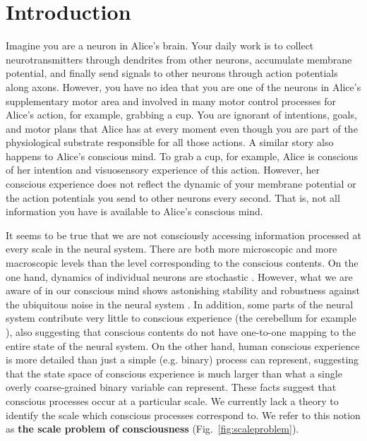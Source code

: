 \documentclass[utf8]{article}
\begin{document}

    \newpage
	\section{Introduction}

		Imagine you are a neuron in Alice's brain. Your daily work is to collect neurotransmitters through dendrites from other neurons, accumulate membrane potential, and finally send signals to other neurons through action potentials along axons. However, you have no idea that you are one of the neurons in Alice's supplementary motor area and involved in many motor control processes for Alice's action, for example, grabbing a cup. You are ignorant of intentions, goals, and motor plans that Alice has at every moment even though you are part of the physiological substrate responsible for all those actions.
		A similar story also happens to Alice's conscious mind. To grab a cup, for example, Alice is conscious of her intention and visuosensory experience of this action. However, her conscious experience does not reflect the dynamic of your membrane potential or the action potentials you send to other neurons every second. That is, not all information you have is available to Alice's conscious mind.

		
		It seems to be true that we are not consciously accessing information processed at every scale in the neural system. There are both more microscopic and more macroscopic levels than the level corresponding to the conscious contents. On the one hand, dynamics of individual neurons are stochastic \citep{Goldwyn2011, White2000}. However, what we are aware of in our conscious mind shows astonishing stability and robustness against the ubiquitous noise in the neural system \citep{mathis1995computational}. In addition, some parts of the neural system contribute very little to conscious experience (the cerebellum for example \citep{lemon2010life}), also suggesting that conscious contents do not have one-to-one mapping to the entire state of the neural system. On the other hand, human conscious experience is more detailed than just a simple (e.g. binary) process can represent, suggesting that the state space of conscious experience is much larger than what a single overly coarse-grained binary variable can represent. These facts suggest that conscious processes occur at a particular scale. We currently lack a theory to identify the scale which conscious processes correspond to. We refer to this notion as \textbf{the scale problem of consciousness} (Fig.~\ref{fig:scaleproblem}).
\end{document}
